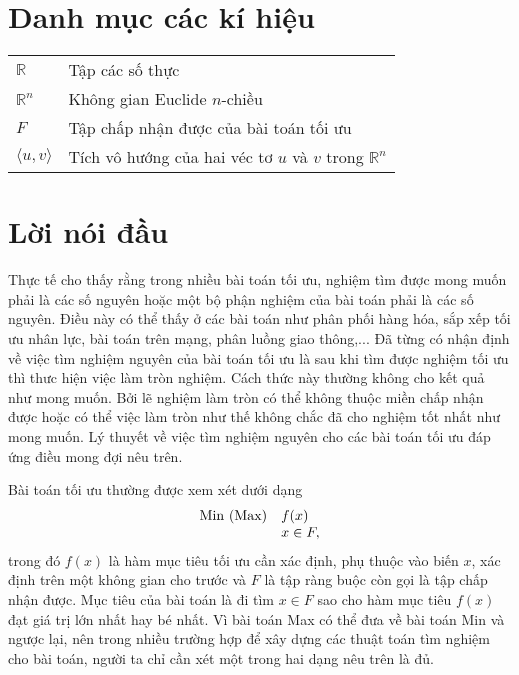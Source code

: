 \documentclass[12pt,a4paper]{report}
\begin{document}
	\newpage
	
	\tableofcontents
	\chapter*{Danh mục các kí hiệu}
	\thispagestyle{fancy}
	\begin{longtable}{l l}
		
		$\mathbb{R}$ & Tập các số thực\\
		$\mathbb{R}^n$ & Không gian Euclide $n$-chiều\\

		
		$F$ & Tập chấp nhận được của bài toán tối ưu\\
		$\langle u, v \rangle$ & Tích vô hướng của hai véc tơ $u$ và $v$ trong $\mathbb{R}^n$\\
		
		
	\end{longtable}
\newpage
{} 
\chapter*{Lời nói đầu}
\thispagestyle{fancy}
\renewcommand{\baselinestretch}{1.2}
Thực tế cho thấy rằng trong nhiều bài toán tối ưu, nghiệm tìm được mong muốn phải là các số nguyên hoặc một bộ phận nghiệm của bài toán phải là các số nguyên. Điều này có thể thấy ở các bài toán như phân phối hàng hóa, sắp xếp tối ưu nhân lực, bài toán trên mạng, phân luồng giao thông,...
Đã từng có nhận định về việc tìm nghiệm nguyên của bài toán tối ưu là sau khi tìm được nghiệm tối ưu thì thưc hiện việc làm tròn nghiệm. Cách thức này thường không cho kết quả như mong muốn. Bởi lẽ nghiệm làm tròn có thể không thuộc miền chấp nhận được hoặc  có thể việc làm tròn như thế không chắc đã cho nghiệm tốt nhất như mong muốn. Lý thuyết về việc tìm nghiệm nguyên cho các bài toán tối ưu đáp ứng điều mong đợi nêu trên.

Bài toán tối ưu thường được xem xét dưới dạng 
$$
\begin{array}{ll}
{\rm Min\ (Max)}& f(x)\\
&x \in F,
\end{array}
$$
trong đó $f(x)$ là hàm mục tiêu tối ưu cần xác định, phụ thuộc vào biến $x$, xác định trên một không gian cho trước và $F$ là tập ràng buộc còn gọi là tập chấp nhận được. Mục tiêu của bài toán là đi tìm $x\in F$ sao cho hàm mục tiêu $f(x)$ đạt giá trị lớn nhất hay bé nhất.
Vì bài toán Max có thể đưa về bài toán Min và ngược lại, nên trong nhiều trường hợp để xây dựng các thuật toán tìm nghiệm cho bài toán, người ta chỉ cần xét một trong hai dạng nêu trên là đủ.
\end{document}
